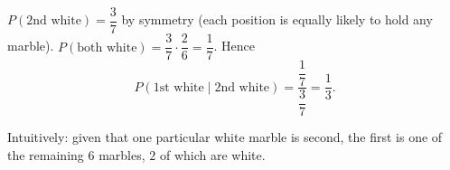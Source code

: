 $P(\text{2nd white})=\dfrac37$ by symmetry (each position is equally likely to hold any marble). $P(\text{both white})=\dfrac37\cdot\dfrac26=\dfrac17$. Hence
\[P(\text{1st white}\mid\text{2nd white})=\dfrac{\dfrac17}{\dfrac37}=\boxed{\dfrac13}.\]

Intuitively: given that one particular white marble is second, the first is one of the remaining $6$ marbles, $2$ of which are white.
